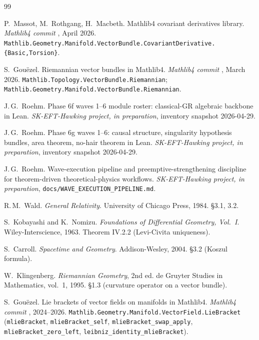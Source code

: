 \documentclass[twocolumn]{revtex4-2}
\begin{document}

\begin{thebibliography}{99}

P.~Massot, M.~Rothgang, H.~Macbeth.
\newblock Mathlib4 covariant derivatives library.
\newblock \emph{Mathlib4 commit \mathlibrev}, April 2026.
\newblock \texttt{Mathlib.Geometry.Manifold.VectorBundle.CovariantDerivative.\{Basic,Torsion\}}.

S.~Gou\"ezel.
\newblock Riemannian vector bundles in Mathlib4.
\newblock \emph{Mathlib4 commit \mathlibrev}, March 2026.
\newblock \texttt{Mathlib.Topology.VectorBundle.Riemannian};
  \texttt{Mathlib.Geometry.Manifold.VectorBundle.Riemannian}.

J.\,G.~Roehm.
\newblock Phase 6f waves 1--6 module roster: classical-GR algebraic
  backbone in Lean.
\newblock \emph{SK-EFT-Hawking project, in preparation},
  inventory snapshot 2026-04-29.

J.\,G.~Roehm.
\newblock Phase 6g waves 1--6: causal structure, singularity
  hypothesis bundles, area theorem, no-hair theorem in Lean.
\newblock \emph{SK-EFT-Hawking project, in preparation},
  inventory snapshot 2026-04-29.

J.\,G.~Roehm.
\newblock Wave-execution pipeline and preemptive-strengthening
  discipline for theorem-driven theoretical-physics workflows.
\newblock \emph{SK-EFT-Hawking project, in preparation},
  \texttt{docs/WAVE\_EXECUTION\_PIPELINE.md}.

R.\,M.~Wald.
\newblock \emph{General Relativity}.
\newblock University of Chicago Press, 1984.
\newblock \S 3.1, 3.2.

S.~Kobayashi and K.~Nomizu.
\newblock \emph{Foundations of Differential Geometry, Vol.~I}.
\newblock Wiley-Interscience, 1963.
\newblock Theorem IV.2.2 (Levi-Civita uniqueness).

S.~Carroll.
\newblock \emph{Spacetime and Geometry}.
\newblock Addison-Wesley, 2004.
\newblock \S 3.2 (Koszul formula).

W.~Klingenberg.
\newblock \emph{Riemannian Geometry}, 2nd ed.
\newblock de Gruyter Studies in Mathematics, vol.\ 1, 1995.
\newblock \S 1.3 (curvature operator on a vector bundle).

S.~Gou\"ezel.
\newblock Lie brackets of vector fields on manifolds in Mathlib4.
\newblock \emph{Mathlib4 commit \mathlibrev}, 2024--2026.
\newblock \texttt{Mathlib.Geometry.Manifold.VectorField.LieBracket}
  (\texttt{mlieBracket}, \texttt{mlieBracket\_self},
  \texttt{mlieBracket\_swap\_apply}, \texttt{mlieBracket\_zero\_left},
  \texttt{leibniz\_identity\_mlieBracket}).

\end{thebibliography}
\end{document}
